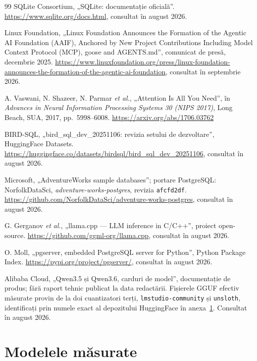 \documentclass[12pt,a4paper]{report}
\newcommand{\code}[1]{\texttt{\small #1}}
\begin{document}
\begin{thebibliography}{99}
SQLite Consortium, „SQLite: documentație oficială”.
\url{https://www.sqlite.org/docs.html}, consultat în august 2026.

Linux Foundation, „Linux Foundation Announces the Formation of the Agentic AI
Foundation (AAIF), Anchored by New Project Contributions Including Model
Context Protocol (MCP), goose and AGENTS.md”, comunicat de presă, decembrie
2025.
\url{https://www.linuxfoundation.org/press/linux-foundation-announces-the-formation-of-the-agentic-ai-foundation},
consultat în septembrie 2026.

A. Vaswani, N. Shazeer, N. Parmar \emph{et al.}, „Attention Is All You Need”,
în \emph{Advances in Neural Information Processing Systems 30 (NIPS 2017)},
Long Beach, SUA, 2017, pp.\ 5998--6008.
\url{https://arxiv.org/abs/1706.03762}

BIRD-SQL, „bird\_sql\_dev\_20251106: revizia setului de dezvoltare”,
HuggingFace Datasets.
\url{https://huggingface.co/datasets/birdsql/bird_sql_dev_20251106},
consultat în august 2026.

Microsoft, „AdventureWorks sample databases”; portare PostgreSQL:
NorfolkDataSci, \emph{adventure-works-postgres}, revizia
\code{afcfd2df}. \url{https://github.com/NorfolkDataSci/adventure-works-postgres},
consultat în august 2026.

G. Gerganov \emph{et al.}, „llama.cpp --- LLM inference in C/C++”, proiect
open-source. \url{https://github.com/ggml-org/llama.cpp}, consultat în august
2026.

O. Moll, „pgserver, embedded PostgreSQL server for Python”, Python Package
Index. \url{https://pypi.org/project/pgserver/}, consultat în august 2026.

Alibaba Cloud, „Qwen3.5 și Qwen3.6, carduri de model”, documentație de
produs; fără raport tehnic publicat la data redactării. Fișierele GGUF
efectiv măsurate provin de la doi cuantizatori terți,
\code{lmstudio-community} și \code{unsloth}, identificați prin numele exact
al depozitului HuggingFace în anexa~\ref{anx:modele}. Consultat în august
2026.

\end{thebibliography}

\appendix
\renewcommand{\thechapter}{\Alph{chapter}}

\chapter{Modelele măsurate}
\label{anx:modele}
\end{document}
